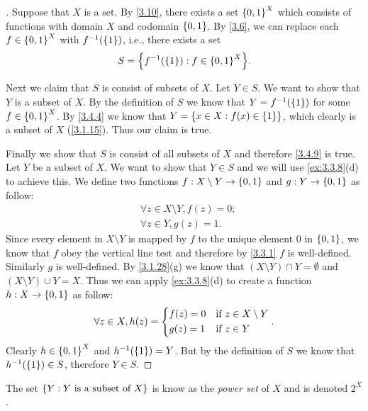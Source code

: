 \begin{proof}[]
  Suppose that \(X\) is a set.
  By \cref{3.10}, there exists a set \(\left\lbrace0, 1\right\rbrace^X\) which consists of functions with domain \(X\) and codomain \(\left\lbrace0, 1\right\rbrace\).
  By \cref{3.6}, we can replace each \(f \in \left\lbrace0, 1\right\rbrace^X\) with \(f^{-1}\pa{\set{1}}\), i.e., there exists a set
  \[
    S = \set{f^{-1}\pa{\set{1}} : f \in \set{0, 1}^X}.
  \]

  Next we claim that \(S\) is consist of subsets of \(X\).
  Let \(Y \in S\).
  We want to show that \(Y\) is a subset of \(X\).
  By the definition of \(S\) we know that \(Y = f^{-1}\pa{\set{1}}\) for some \(f \in \left\lbrace0, 1\right\rbrace^X\).
  By \cref{3.4.4} we know that \(Y = \left\lbrace x \in X : f(x) \in \left\lbrace1\right\rbrace\right\rbrace\), which clearly is a subset of \(X\) (\cref{3.1.15}).
  Thus our claim is true.

  Finally we show that \(S\) is consist of all subsets of \(X\) and therefore \cref{3.4.9} is true.
  Let \(Y\) be a subset of \(X\).
  We want to show that \(Y \in S\) and we will use \cref{ex:3.3.8}(d) to achieve this.
  We define two functions \(f : X \setminus Y \to \left\lbrace0, 1\right\rbrace\) and \(g : Y \to \left\lbrace0, 1\right\rbrace\) as follow:
  \begin{align*}
     & \forall z \in X \setminus Y, f(z) = 0; \\
     & \forall z \in Y, g(z) = 1.
  \end{align*}
  Since every element in \(X \setminus Y\) is mapped by \(f\) to the unique element \(0\) in \(\left\lbrace0, 1\right\rbrace\), we know that \(f\) obey the vertical line test and therefore by \cref{3.3.1} \(f\) is well-defined.
  Similarly \(g\) is well-defined.
  By \cref{3.1.28}(g) we know that \((X \setminus Y) \cap Y = \emptyset\) and \((X \setminus Y) \cup Y = X\).
  Thus we can apply \cref{ex:3.3.8}(d) to create a function \(h : X \to \left\lbrace0, 1\right\rbrace\) as follow:
  \[
    \forall z \in X, h(z) = \begin{dcases}
      f(z) = 0 & \text{if } z \in X \setminus Y \\
      g(z) = 1 & \text{if } z \in Y
    \end{dcases}.
  \]
  Clearly \(h \in \left\lbrace0, 1\right\rbrace^X\) and \(h^{-1}\pa{\set{1}} = Y\).
  But by the definition of \(S\) we know that \(h^{-1}\pa{\set{1}} \in S\), therefore \(Y \in S\).
\end{proof}

\begin{rmk}\label{3.4.10}
  The set \(\left\lbrace Y : Y \text{ is a subset of } X\right\rbrace\) is know as the \emph{power set} of \(X\) and is denoted \(2^X\).
\end{rmk}


